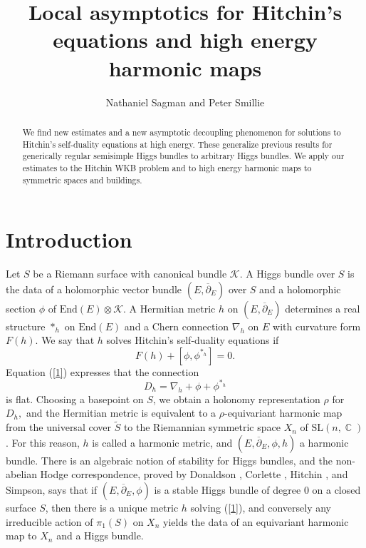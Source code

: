 \documentclass[10pt]{amsart}
\theoremstyle{definition}
\DeclareMathOperator{\C}{\mathbb{C}}
\begin{document}
\title{Local asymptotics for Hitchin's equations and high energy harmonic maps}
\author{Nathaniel Sagman and Peter Smillie}
\begin{abstract}
We find new estimates and a new asymptotic decoupling phenomenon for solutions to Hitchin's self-duality equations at high energy. These generalize previous results for generically regular semisimple Higgs bundles to arbitrary Higgs bundles. We apply our estimates to the Hitchin WKB problem and to high energy harmonic maps to symmetric spaces and buildings. 

\end{abstract}
\maketitle

\section{Introduction} Let $S$ be a Riemann surface with canonical bundle $\mathcal{K}$. A Higgs bundle over $S$ is the data of a holomorphic vector bundle $(E,\overline{\partial}_E)$ over $S$ and a holomorphic section $\phi$ of $\textrm{End}(E)\otimes\mathcal{K}.$
A Hermitian metric $h$ on $(E,\overline{\partial}_E)$ determines a real structure $*_h$ on $\mathrm{End}(E)$ and a Chern connection $\nabla_h$ on $E$ with curvature form $F(h).$ We say that $h$ solves Hitchin's self-duality equations if 
\begin{equation}\label{1}
    F(h)+[\phi,\phi^{*_h}]=0.
\end{equation}
Equation (\ref{1}) expresses that the connection $$D_h=\nabla_h + \phi + \phi^{*_h}$$ is flat. Choosing a basepoint on $S$, we obtain a holonomy representation $\rho$ for $D_h,$ and the Hermitian metric is equivalent to a $\rho$-equivariant harmonic map from the universal cover $\tilde{S}$ to the Riemannian symmetric space $X_n$ of $\textrm{SL}(n,\C)$. For this reason, $h$ is called a harmonic metric, and $(E,\overline{\partial}_E,\phi,h)$ a harmonic bundle. There is an algebraic notion of stability for Higgs bundles, and the non-abelian Hodge correspondence, proved by Donaldson \cite{D}, Corlette \cite{C}, Hitchin \cite{Hi}, and Simpson, \cite{Si} says that if $(E,\overline{\partial}_E,\phi)$ is a stable Higgs bundle of degree $0$ on a closed surface $S$, then there is a unique metric $h$ solving (\ref{1}), and conversely any irreducible action of $\pi_1(S)$ on $X_n$ yields the data of an equivariant harmonic map to $X_n$ and a Higgs bundle.
\end{document}
